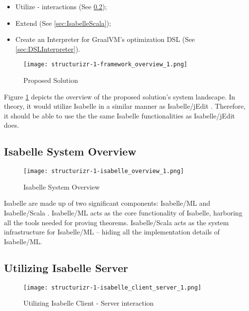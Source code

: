 \begin{itemize}
    \item Utilize  -  interactions (See \ref{sec:IsabelleServer});
    \item Extend  (See \ref{sec:IsabelleScala});
    \item Create an Interpreter for GraalVM's optimization DSL (See \ref{sec:DSLInterpreter}).
\end{itemize}

\begin{figure}[h]
      \centering
      \texttt{[image: structurizr-1-framework\_overview\_1.png]}
      \caption{Proposed Solution}
      \label{fig:SystemLandscape}
\end{figure}

Figure \ref{fig:SystemLandscape} depicts the overview of the proposed solution's system landscape. In theory, it would utilize Isabelle in a similar 
manner as Isabelle/jEdit \cite{isabelleSystem}. Therefore, it should be able to use the the same Isabelle functionalities as Isabelle/jEdit does.

\pagebreak

\subsection{Isabelle System Overview}
\label{sec:IsabelleSystemOverview}

\begin{figure}[h]
      \centering
      \texttt{[image: structurizr-1-isabelle\_overview\_1.png]}
      \caption{Isabelle System Overview}
      \label{fig:IsabelleSystem}
\end{figure}

Isabelle are made up of two significant components: Isabelle/ML and Isabelle/Scala \cite[Ch. 5]{isabelleSystem}. Isabelle/ML acts as the core 
functionality of Isabelle, harboring all the tools needed for proving theorems. Isabelle/Scala acts as the system infrastructure for Isabelle/ML 
-- hiding all the implementation details of Isabelle/ML.

\subsection{Utilizing Isabelle Server}
\label{sec:IsabelleServer}

\begin{figure}[h]
      \centering
      \texttt{[image: structurizr-1-isabelle\_client\_server\_1.png]}
      \caption{Utilizing Isabelle Client - Server interaction}
      \label{fig:IsabelleServer}
\end{figure}

